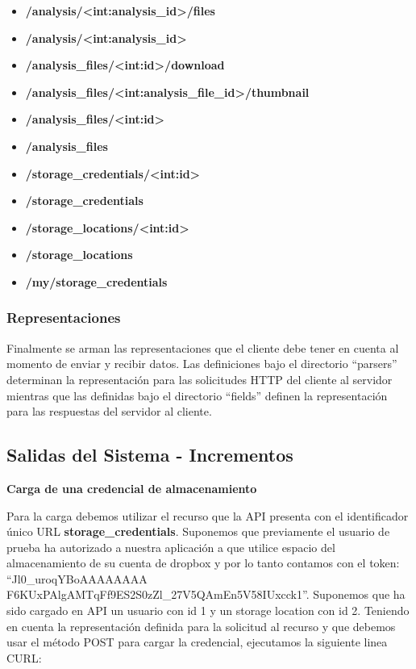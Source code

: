 \begin{itemize}
	\item\textbf{/analysis/<int:analysis\_id>/files}
	\item\textbf{/analysis/<int:analysis\_id>}
	\item\textbf{/analysis\_files/<int:id>/download}
	\item\textbf{/analysis\_files/<int:analysis\_file\_id>/thumbnail}
	\item\textbf{/analysis\_files/<int:id>}
	\item\textbf{/analysis\_files}
	\item\textbf{/storage\_credentials/<int:id>}
	\item\textbf{/storage\_credentials}
	\item\textbf{/storage\_locations/<int:id>}
	\item\textbf{/storage\_locations}
	\item\textbf{/my/storage\_credentials}
\end{itemize}

\subsubsection{Representaciones}
Finalmente se arman las representaciones que el cliente debe tener en cuenta al momento de enviar y recibir datos. Las definiciones bajo el directorio ``parsers'' determinan la representación para las solicitudes HTTP del cliente al servidor mientras que las definidas bajo el directorio ``fields'' definen la representación para las respuestas del servidor al cliente.





\subsection {Salidas del Sistema - Incrementos}
\textbf{Carga de una credencial de almacenamiento}

Para la carga debemos utilizar el recurso que la API presenta con el identificador único URL \textbf{\/storage\_credentials}. Suponemos que previamente el usuario de prueba ha autorizado a nuestra aplicación a que utilice espacio del almacenamiento de su cuenta de dropbox y por lo tanto contamos con el token: ``Jl0\_uroqYBoAAAAAAAA
F6KUxPAlgAMTqFf9ES2S0zZl\_27V5QAmEn5V58IUxcck1''. Suponemos que ha sido cargado en API un usuario con id 1 y un storage location con id 2. Teniendo en cuenta la representación definida para la solicitud al recurso y que debemos usar el método POST para cargar la credencial, ejecutamos la siguiente linea CURL:

